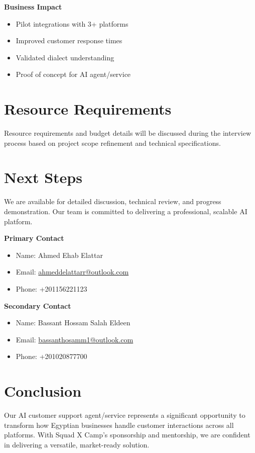 \documentclass[12pt,a4paper]{article}
\begin{document}
\textbf{Business Impact}
\begin{itemize}
    \item Pilot integrations with 3+ platforms
    \item Improved customer response times
    \item Validated dialect understanding
    \item Proof of concept for AI agent/service
\end{itemize}

\section*{Resource Requirements}
Resource requirements and budget details will be discussed during the interview process based on project scope refinement and technical specifications.

\section*{Next Steps}
We are available for detailed discussion, technical review, and progress demonstration. Our team is committed to delivering a professional, scalable AI platform.

\textbf{Primary Contact}
\begin{itemize}
    \item Name: Ahmed Ehab Elattar
    \item Email: \href{mailto:ahmeddelattarr@outlook.com}{ahmeddelattarr@outlook.com}
    \item Phone: +201156221123
\end{itemize}

\textbf{Secondary Contact}
\begin{itemize}
    \item Name: Bassant Hossam Salah Eldeen
    \item Email: \href{mailto:bassanthosamm1@outlook.com}{bassanthosamm1@outlook.com}
    \item Phone: +201020877700
\end{itemize}

\section*{Conclusion}
Our AI customer support agent/service represents a significant opportunity to transform how Egyptian businesses handle customer interactions across all platforms. With Squad X Camp's sponsorship and mentorship, we are confident in delivering a versatile, market-ready solution.
\end{document}
